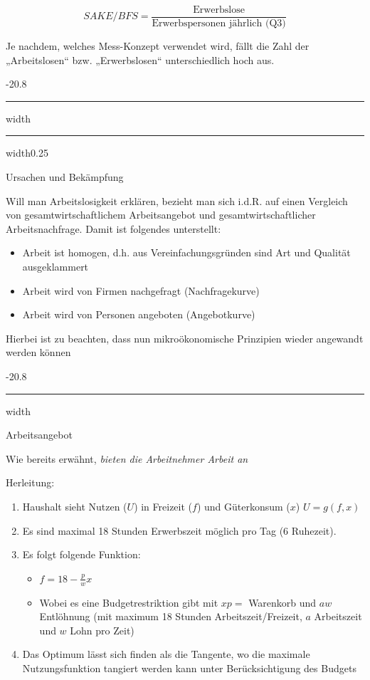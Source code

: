 \documentclass[9pt, landscape, fleqn]{scrartcl}
\makeatletter
\renewcommand{\subsection}{\@startsection{subsection}{1}{0mm}%
{-2\baselineskip}{0.8\baselineskip}%
{\hrule depth 0.2pt width\columnwidth\hrule depth0.75pt
width0.25\columnwidth\vspace*{1.2em}\large\bfseries\rmfamily}}
\renewcommand{\subsubsection}{\@startsection{subsubsection}{1}{0mm}%
{-2\baselineskip}{0.8\baselineskip}%
{\hrule depth 0.2pt width\columnwidth\vspace*{1.2em}\normalsize\bfseries\rmfamily}}
\makeatother
\begin{document}
\begin{multicols*}{3}
\begin{equation}
    SAKE/BFS = \frac{\text{Erwerbslose}}{\text{Erwerbspersonen jährlich (Q3)}}
\end{equation}

Je nachdem, welches Mess-Konzept verwendet wird, fällt die Zahl der „Arbeitslosen“ bzw. „Erwerbslosen“ unterschiedlich hoch aus.

\subsection{Ursachen und Bekämpfung}

Will man Arbeitslosigkeit erklären, bezieht man sich i.d.R. auf einen Vergleich von gesamtwirtschaftlichem Arbeitsangebot und gesamtwirtschaftlicher Arbeitsnachfrage. Damit ist folgendes unterstellt:

\begin{itemize}
    \item Arbeit ist homogen, d.h. aus Vereinfachungsgründen sind Art und Qualität ausgeklammert 
    \item Arbeit wird von Firmen nachgefragt (Nachfragekurve)
    \item Arbeit wird von Personen angeboten (Angebotkurve)
\end{itemize}

Hierbei ist zu beachten, dass nun mikroökonomische Prinzipien wieder angewandt werden können

\subsubsection{Arbeitsangebot}

Wie bereits erwähnt, \emph{bieten die Arbeitnehmer Arbeit an} \newline 

Herleitung:

\begin{enumerate}
    \item Haushalt sieht Nutzen ($U$) in Freizeit ($f$) und Güterkonsum ($x$) $U = g(f,x)$
    \item Es sind maximal 18 Stunden Erwerbszeit möglich pro Tag (6 Ruhezeit). 
    \item Es folgt folgende Funktion:
    \begin{itemize}
        \item $f = 18-\frac{p}{w}x$
        \item Wobei es eine Budgetrestriktion gibt mit $xp =$ Warenkorb und $aw$ Entlöhnung (mit maximum 18 Stunden Arbeitszeit/Freizeit, $a$ Arbeitszeit und $w$ Lohn pro Zeit)
    \end{itemize}
    \item Das Optimum lässt sich finden als die Tangente, wo die maximale Nutzungsfunktion tangiert werden kann unter Berücksichtigung des Budgets
\end{enumerate}


\end{multicols*}
\end{document}
